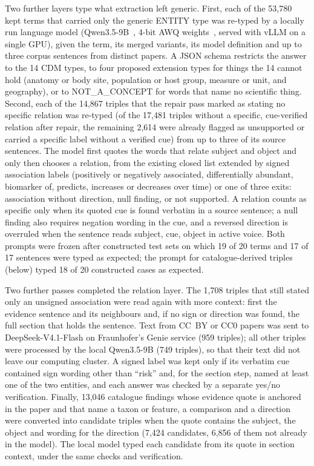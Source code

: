 \documentclass[referee,lineno,pdflatex,sn-vancouver-num]{sn-jnl}
\theoremstyle{thmstyleone}%
\theoremstyle{thmstyletwo}%
\theoremstyle{thmstylethree}%
\begin{document}
Two further layers type what extraction left generic. First, each of the
53,780 kept terms that carried only the generic ENTITY type was re-typed by
a locally run language model (Qwen3.5-9B~\cite{qwen35card}, 4-bit AWQ
weights~\cite{lin2023awq}, served with vLLM on a single GPU), given the
term, its merged variants, its model definition and up to three corpus
sentences from distinct papers. A JSON schema restricts the answer to the
14 CDM types, to four proposed extension types for things the 14 cannot
hold (anatomy or body site, population or host group, measure or unit, and
geography), or to NOT\_A\_CONCEPT for words that name no scientific thing.
Second, each of the 14,867 triples that the repair pass marked as stating
no specific relation was re-typed (of the 17,481 triples without a specific,
cue-verified relation after repair, the remaining 2,614 were already flagged
as unsupported or carried a specific label without a verified cue) from up to three of its source sentences. The
model first quotes the words that relate subject and object and only then
chooses a relation, from the existing closed list extended by signed
association labels (positively or negatively associated, differentially
abundant, biomarker of, predicts, increases or decreases over time) or one
of three exits: association without direction, null finding, or not
supported. A relation counts as specific only when its quoted cue is found
verbatim in a source sentence; a null finding also requires negation
wording in the cue, and a reversed direction is overruled when the
sentence reads subject, cue, object in active voice. Both prompts were
frozen after constructed test sets on which 19 of 20 terms and 17 of 17
sentences were typed as expected; the prompt for catalogue-derived triples
(below) typed 18 of 20 constructed cases as expected.

Two further passes completed the relation layer. The 1,708 triples that
still stated only an unsigned association were read again with more
context: first the evidence sentence and its neighbours and, if no sign or
direction was found, the full section that holds the sentence. Text from
CC~BY or CC0 papers was sent to DeepSeek-V4.1-Flash on Fraunhofer's Genie
service (959 triples); all other triples were processed by the local
Qwen3.5-9B (749 triples), so that their text did not leave our computing
cluster. A signed label was kept only if its verbatim cue contained sign
wording other than ``risk'' and, for the section step, named at least one
of the two entities, and each answer was checked by a separate yes/no
verification. Finally, 13,046 catalogue findings whose evidence quote is
anchored in the paper and that name a taxon or feature, a comparison and a
direction were converted into candidate triples when the quote contains
the subject, the object and wording for the direction (7,424 candidates,
6,856 of them not already in the model). The local model typed each
candidate from its quote in section context, under the same checks and
verification.
\end{document}
